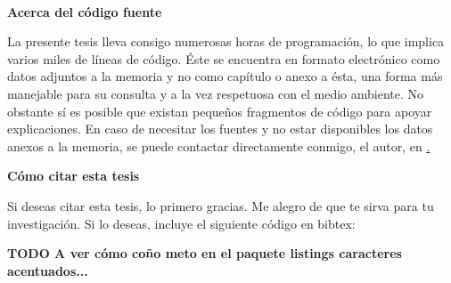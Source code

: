 \cleardoublepage
\begin{fullwidth}
~\vfill
\thispagestyle{empty}
\setlength{\parindent}{0pt}
\setlength{\parskip}{\baselineskip}
\par{
	\textbf{Acerca del código fuente}
	
	La presente tesis lleva consigo numerosas horas de programación, lo que implica varios miles de líneas de código. Éste se encuentra en formato electrónico como datos adjuntos a la memoria y no como capítulo o anexo a ésta, una forma más manejable para su consulta y a la vez respetuosa con el medio ambiente. No obstante sí es posible que existan pequeños fragmentos de código para apoyar explicaciones. En caso de necesitar los fuentes y no estar disponibles los datos anexos a la memoria, se puede contactar directamente conmigo, el autor, en \href{mailto:alberto.diaz@upm.es}.
	}

\par{
	\textbf{Cómo citar esta tesis}
	
	Si deseas citar esta tesis, lo primero gracias. Me alegro de que te sirva para tu investigación. Si lo deseas, incluye el siguiente código en bibtex:
	
	\textbf{TODO A ver cómo coño meto en el paquete listings caracteres acentuados...}
	}


\end{fullwidth}

